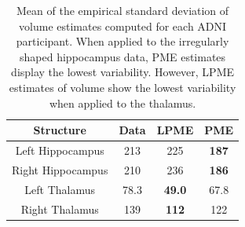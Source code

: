 \documentclass[11pt,reqno]{article}
\theoremstyle{definition}
\begin{document}
%
\begin{table}[ht]
  \centering
  \begin{tabular}{|c c c c|}
    \hline
    Structure & Data & LPME & PME  \\
    \hline
    Left Hippocampus & 213 & 225 & \textbf{187} \\
    Right Hippocampus & 210 & 236 & \textbf{186} \\
    Left Thalamus & 78.3 & \textbf{49.0} & 67.8 \\
    Right Thalamus & 139 & \textbf{112} & 122 \\
    \hline
  \end{tabular}
  \caption{Mean of the empirical standard deviation of volume estimates computed for each ADNI participant. When applied to the irregularly shaped hippocampus data, PME estimates display the lowest variability. However, LPME estimates of volume show the lowest variability when applied to the thalamus.}
  \label{table:adni_volume_sds}
\end{table}
\end{document}
